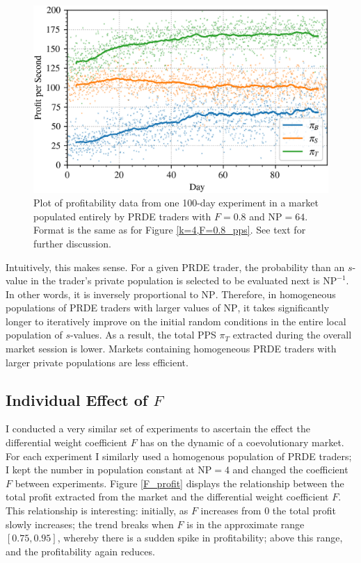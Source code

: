 \documentclass[conference]{IEEEtran}
\begin{document}
\begin{figure}[htbp]
    \centerline{\includegraphics[width=\columnwidth]{k=64,F=0.8_pps.png}}
    \caption{
        Plot of profitability data from one 100-day experiment in a market populated entirely by PRDE traders with $F=0.8$ and $\mathrm{NP}=64$.
        Format is the same as for Figure \ref{k=4,F=0.8_pps}.
        See text for further discussion.
    }
    \label{k=64,F=0.8_pps}
\end{figure}

Intuitively, this makes sense.
For a given PRDE trader, the probability than an $s$-value in the trader's private population is selected to be evaluated next is $\mathrm{NP}^{-1}$.
In other words, it is inversely proportional to $\mathrm{NP}$.
Therefore, in homogeneous populations of PRDE traders with larger values of $\mathrm{NP}$, it takes significantly longer to iteratively improve on the initial random conditions in the entire local population of $s$-values.
As a result, the total PPS $\pi_T$ extracted during the overall market session is lower.
Markets containing homogeneous PRDE traders with larger private populations are less efficient.

\subsection{Individual Effect of $F$}

I conducted a very similar set of experiments to ascertain the effect the differential weight coefficient $F$ has on the dynamic of a coevolutionary market.
For each experiment I similarly used a homogenous population of PRDE traders; I kept the number in population constant at $\mathrm{NP}=4$ and changed the coefficient $F$ between experiments.
Figure \ref{F_profit} displays the relationship between the total profit extracted from the market and the differential weight coefficient $F$.
This relationship is interesting: initially, as $F$ increases from $0$ the total profit slowly increases; the trend breaks when $F$ is in the approximate range $[0.75, 0.95]$, whereby there is a sudden spike in profitability; above this range, and the profitability again reduces.
\end{document}

